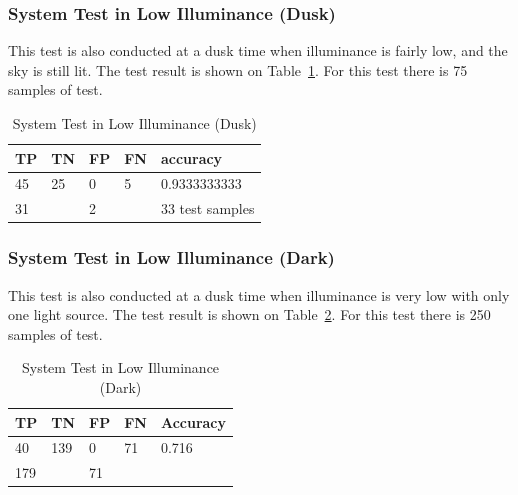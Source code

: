 \subsubsection{System Test in Low Illuminance (Dusk)}
\label{subsubsec:hedect_test_lowillum_dusk}

\par This test is also conducted at a dusk time when illuminance is fairly low, and the sky is still lit. The test result is shown on Table~\ref{tb:systest_lowillum_dusk}. For this test there is 75 samples of test.

\begin{table}
  \centering
  \caption{System Test in Low Illuminance (Dusk)}
  \label{tb:systest_lowillum_dusk}
  \begin{tabular}{|l|l|l|l|l|} 
  \hline
  TP & TN                    & FP & FN                & accuracy         \\ 
  \hline
  45 & 25                    & 0  & 5                 & 0.9333333333    \\ 
  \hline
  \multicolumn{2}{|l|}{31}   & \multicolumn{2}{l|}{2} & 33 test samples  \\
  \hline
  \end{tabular}
\end{table}

\subsubsection{System Test in Low Illuminance (Dark)}
\label{subsubsec:hedect_test_lowillum_dark}

\par This test is also conducted at a dusk time when illuminance is very low with only one light source. The test result is shown on Table~\ref{tb:systest_lowillum_dark}. For this test there is 250 samples of test.

\begin{table}
  \centering
  \caption{System Test in Low Illuminance (Dark)}
  \label{tb:systest_lowillum_dark}
  \begin{tabular}{|l|l|l|l|l|} 
    \hline
    TP & TN                     & FP & FN                 & Accuracy  \\ 
    \hline
    40 & 139                    & 0  & 71                 & 0.716     \\ 
    \hline
    \multicolumn{2}{|l|}{179}   & \multicolumn{2}{l|}{71} &           \\
    \hline
  \end{tabular}
\end{table}

